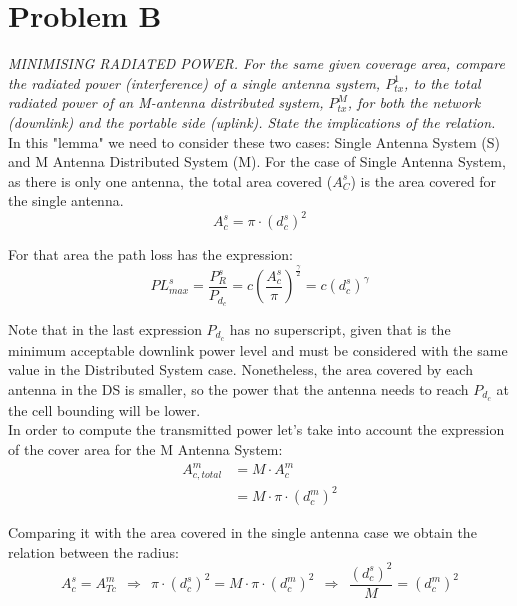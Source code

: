 \section{Problem B}
\textit{MINIMISING RADIATED POWER. For the same given coverage area, compare the radiated power (interference) of a single antenna system, $P_{tx}^1$, to the total radiated power of an M-antenna distributed system, $P_{tx}^M$, for both the network (downlink) and the portable side (uplink). State the implications of the relation.}\\

In this "lemma" we need to consider these two cases: Single Antenna System (S) and M Antenna Distributed System (M).
For the case of Single Antenna System, as there is only one antenna, the total area covered ($A^s_C$) is the area covered for the single antenna.
\begin{equation}
A^s_c = \pi \cdot (d^s_{c})^2
\end{equation}

For that area the path loss has the expression:
\begin{equation}
PL^s_{max} = \dfrac{P^s_{R}}{P_{d_{c}}} = c\left(\dfrac{A^s_c}{\pi}\right)^{\frac{\gamma}{2}}= c\left(d^s_c\right) ^{\gamma}
\end{equation}

Note that in the last expression $P_{d_{c}}$ has no superscript, given that is the minimum acceptable downlink power level and must be considered with the same value in the Distributed System case. Nonetheless, the area covered by each antenna in the DS is smaller, so the power that the antenna needs to reach $P_{d_{c}}$ at the cell bounding will be lower.\\

In order to compute the transmitted power let's take into account the expression of the cover area for the M Antenna System:
\begin{align*}
A^m_{c,total} &= M \cdot A^m_{c} \\
&= M \cdot \pi \cdot (d^m_{c})^{2}
\end{align*}

Comparing it with the area covered in the single antenna case we obtain the relation between the radius:
\begin{equation}
A^s_{c}= A^m_{Tc}\ \ \Longrightarrow \ \ \pi \cdot (d^s_{c})^2 = M \cdot \pi \cdot (d^m_{c})^2 \ \  \Longrightarrow \ \
\frac{(d^s_{c})^2}{M} = (d^m_{c})^2
\end{equation}

